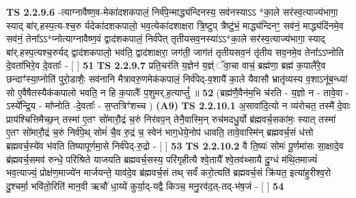 \documentclass[17pt]{extarticle}
\begin{document}
                  \newline
                                \textbf{ TS 2.2.9.6} \newline
                  -त्याग्नावैष्ण॒व-मेका॑दशकपालं॒ निर्व॑पे॒न्माद्ध्य॑न्दिनस्य॒ सव॑नस्याऽऽ *का॒ले सर॑स्व॒त्याज्य॑भागा॒ स्याद् बा॑र्.हस्प॒त्य-श्च॒रु र्यदेका॑दशकपालो॒ भव॒त्येका॑दशाक्षरा त्रि॒ष्टुप् त्रैष्टु॑भं॒ माद्ध्य॑न्दिनꣳ॒॒ सव॑नं॒ माद्ध्य॑दिंनमे॒व सव॑नं॒ तेना᳚ऽऽ*प्नोत्याग्नावैष्ण॒वं द्वाद॑शकपालं॒ निर्व॑पेत् तृतीयसव॒नस्या॑ऽऽ*का॒ले सर॑स्व॒त्याज्य॑भागा॒ स्याद् बा॑र्.हस्प॒त्यश्च॒रुर्यद् द्वाद॑शकपालो॒ भव॑ति॒ द्वाद॑शाक्षरा॒ जग॑ती॒ जाग॑तं तृतीयसव॒नं तृ॑तीय सव॒नमे॒व तेना᳚ऽऽप्नोति दे॒वता॑भिरे॒व दे॒वताः᳚ - [  ] \textbf{  51} \newline
                  \newline
                                \textbf{ TS 2.2.9.7} \newline
                  प्रति॒चर॑ति य॒ज्ञेन॑ य॒ज्ञ्ं ॅवा॒चा वाचं॒ ब्रह्म॑णा॒ ब्रह्म॑ क॒पालै॑रे॒व छन्दाꣳ॑स्या॒प्नोति॑ पुरो॒डाशैः॒ सव॑नानि मैत्रावरु॒णमेक॑कपालं॒ निर्व॑पेद्-व॒शायै॑ का॒ले यैवासौ भ्रातृ॑व्यस्य व॒शाऽनू॑ब॒न्ध्या॑ सो ए॒वैषैतस्यैक॑कपालो भवति॒ न हि क॒पालैः᳚ प॒शुमर्.ह॒त्याप्तुं᳚ ॥ \textbf{  52} \newline
                  \newline
                      (ब्रह्म॑णै॒वैन॑म॒भि च॑रति - य॒ज्ञो न - तावे॒वा - ऽस्ये᳚न्द्रि॒य - मा᳚प्नोति -दे॒वताः᳚ - स॒प्तत्रिꣳ॑शच्च )  \textbf{(A9)} \newline \newline
                                        \textbf{ TS 2.2.10.1} \newline
                  अ॒सावा॑दि॒त्यो न व्य॑रोचत॒ तस्मै॑ दे॒वाः प्राय॑श्चित्तिमैच्छ॒न् तस्मा॑ ए॒तꣳ सो॑मारौ॒द्रं च॒रुं निर॑वप॒न् तेनै॒वास्मि॒न् रुच॑मदधु॒र्यो ब्र॑ह्मवर्च॒सका॑मः॒ स्यात् तस्मा॑ ए॒तꣳ सो॑मारौ॒द्रं च॒रुं निर्व॑पे॒थ् सोमं॑ चै॒व रु॒द्रं च॒ स्वेन॑ भाग॒धेये॒नोप॑ धावति॒ तावे॒वास्मि॑न् ब्रह्मवर्च॒सं ध॑त्तो ब्रह्मवर्च॒स्ये॑व भ॑वति तिष्यापूर्णमा॒से निर्व॑पेद्-रु॒द्रो - [  ] \textbf{  53} \newline
                  \newline
                                \textbf{ TS 2.2.10.2} \newline
                  वै ति॒ष्यः॑ सोमः॑ पू॒र्णमा॑सः सा॒क्षादे॒व ब्र॑ह्मवर्च॒समव॑ रुन्धे॒ परि॑श्रिते याजयति ब्रह्मवर्च॒सस्य॒ परि॑गृहीत्यै श्वे॒तायै᳚ श्वे॒तव॑थ्सायै दु॒ग्धं म॑थि॒तमाज्यं॑ भव॒त्याज्यं॒ प्रोक्ष॑ण॒माज्ये॑न मार्जयन्ते॒ याव॑दे॒व ब्र॑ह्मवर्च॒सं तथ् सर्वं॑ करो॒त्यति॑ ब्रह्मवर्च॒सं क्रि॑यत॒ इत्या॑हुरीश्व॒रो दु॒श्चर्मा॒ भवि॑तो॒रिति॑ मान॒वी ऋचौ॑ धा॒य्ये॑ कुर्या॒द्-यद्वै किञ्च॒ मनु॒रव॑द॒त्-तद्-भ॑ष॒जं - [  ] \textbf{  54} \newline
\end{document}
